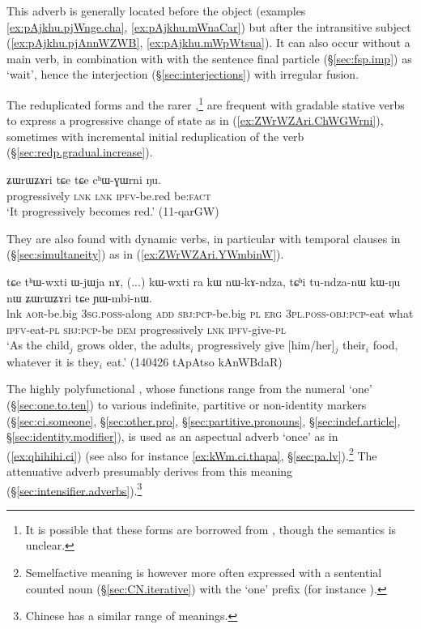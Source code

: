 This adverb is generally located before the object (examples \ref{ex:pAjkhu.pjWnge.cha}, \ref{ex:pAjkhu.mWnaCar}) but after the intransitive subject (\ref{ex:pAjkhu.pjAnnWZWB}, \ref{ex:pAjkhu.mWpWtsua}).  It can also occur without a main verb, in combination with with the sentence final particle  (§\ref{sec:fsp.imp}) as  `wait', hence the interjection  (§\ref{sec:interjections}) with irregular fusion.
  
The reduplicated forms  and the rarer ,\footnote{It is possible that these forms are borrowed from , though the semantics is unclear. } are frequent with gradable stative verbs to express a progressive change of state as in (\ref{ex:ZWrWZAri.ChWGWrni}), sometimes with incremental initial reduplication of the verb (§\ref{sec:redp.gradual.increase}).


\begin{exe}
\ex \label{ex:ZWrWZAri.ChWGWrni}
\gll ʑɯrɯʑɤri tɕe tɕe cʰɯ-ɣɯrni ŋu. \\
progressively \textsc{lnk} \textsc{lnk} \textsc{ipfv}-be.red be:\textsc{fact} \\
\glt `It progressively becomes red.' (11-qarGW)
\end{exe}

They are also found with dynamic verbs, in particular with temporal clauses in  (§\ref{sec:simultaneity}) as in (\ref{ex:ZWrWZAri.YWmbinW}).

\begin{exe}
\ex \label{ex:ZWrWZAri.YWmbinW}
\gll  tɕe tʰɯ-wxti ɯ-jɯja nɤ, (...) kɯ-wxti ra kɯ nɯ-kɤ-ndza, tɕʰi tu-ndza-nɯ kɯ-ŋu nɯ ʑɯrɯʑɤri tɕe ɲɯ-mbi-nɯ. \\
lnk  \textsc{aor}-be.big  \textsc{3sg}.\textsc{poss}-along \textsc{add} {  } \textsc{sbj}:\textsc{pcp}-be.big \textsc{pl} \textsc{erg} \textsc{3pl}.\textsc{poss}-\textsc{obj}:\textsc{pcp}-eat what \textsc{ipfv}-eat-\textsc{pl} \textsc{sbj}:\textsc{pcp}-be \textsc{dem} progressively \textsc{lnk} \textsc{ipfv}-give-\textsc{pl} \\
\glt  `As the child$_j$ grows older, the adults$_i$ progressively give [him/her]$_j$ their$_i$ food, whatever it is they$_i$ eat.' (140426 tApAtso kAnWBdaR)
\end{exe}
 

The highly polyfunctional , whose functions range from the numeral `one' (§\ref{sec:one.to.ten}) to various indefinite, partitive or non-identity markers (§\ref{sec:ci.someone}, §\ref{sec:other.pro}, §\ref{sec:partitive.pronouns}, §\ref{sec:indef.article}, §\ref{sec:identity.modifier}), is used as an aspectual adverb `once' as in (\ref{ex:qhihihi.ci}) (see also for instance \ref{ex:kWm.ci.thapa}, §\ref{sec:pa.lv}).\footnote{Semelfactive meaning is however more often expressed with a sentential counted noun (§\ref{sec:CN.iterative}) with the `one' prefix (for instance ). } The attenuative adverb  presumably derives from this meaning (§\ref{sec:intensifier.adverbs}).\footnote{Chinese  has a similar range of meanings. }

